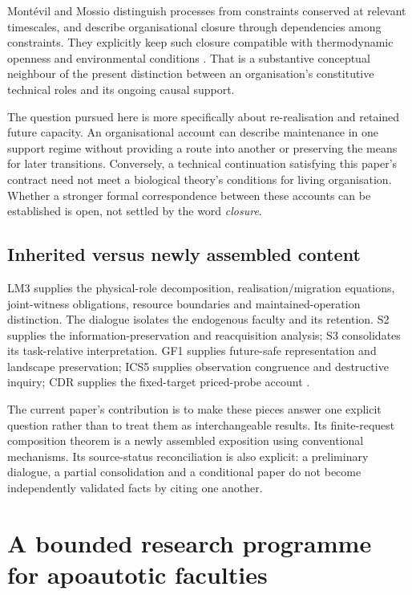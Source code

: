 Mont\'evil and Mossio distinguish processes from constraints conserved at relevant timescales, and describe organisational closure through dependencies among constraints. They explicitly keep such closure compatible with thermodynamic openness and environmental conditions \cite{CLOSURE}. That is a substantive conceptual neighbour of the present distinction between an organisation's constitutive technical roles and its ongoing causal support.

The question pursued here is more specifically about re-realisation and retained future capacity. An organisational account can describe maintenance in one support regime without providing a route into another or preserving the means for later transitions. Conversely, a technical continuation satisfying this paper's contract need not meet a biological theory's conditions for living organisation. Whether a stronger formal correspondence between these accounts can be established is open, not settled by the word \emph{closure}.

\subsection{Inherited versus newly assembled content}

LM3 supplies the physical-role decomposition, realisation/migration equations, joint-witness obligations, resource boundaries and maintained-operation distinction. The dialogue isolates the endogenous faculty and its retention. S2 supplies the information-preservation and reacquisition analysis; S3 consolidates its task-relative interpretation. GF1 supplies future-safe representation and landscape preservation; ICS5 supplies observation congruence and destructive inquiry; CDR supplies the fixed-target priced-probe account \cite{LM3,D,S2,S3,GF1,ICS,CDR}.

The current paper's contribution is to make these pieces answer one explicit question rather than to treat them as interchangeable results. Its finite-request composition theorem is a newly assembled exposition using conventional mechanisms. Its source-status reconciliation is also explicit: a preliminary dialogue, a partial consolidation and a conditional paper do not become independently validated facts by citing one another.

\section{A bounded research programme for apoautotic faculties}
\label{sec:research}

